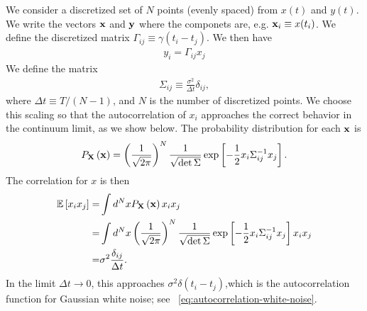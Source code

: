 We consider a discretized set of $N$ points (evenly spaced) from
$x(t)$ and $y(t)$. We write the vectors 
${\bf x}$ and ${\bf y}$ where the componets are, e.g.
${\bf x}_i \equiv x(t_i)$.
We define the discretized matrix $\Gamma_{ij} \equiv \gamma\left(t_i-t_j\right)$.
We then have
\begin{align}
    y_i = \Gamma_{ij} x_j
\end{align}
We define the matrix
\begin{align}
    \Sigma_{ij}
    \equiv 
    \frac{\sigma^2}{\Delta t} \delta_{ij}
    ,
\end{align}
where $\Delta t \equiv T/\left(N-1\right)$, and $N$ is the number of discretized points. 
We choose this scaling so that the autocorrelation of $x_i$ approaches the
correct behavior in the continuum limit, as we show below.
The probability distribution for each ${\bf x}$ is
\begin{align}
    P_{\bf X}\left({\bf x}\right)
    =
    \left(\frac{1}{\sqrt{2\pi}}\right)^N\frac{1}{\sqrt{\det{\Sigma}}}
    \exp\left[-\frac{1}{2}x_i\Sigma^{-1}_{ij}x_j\right]
    .
\end{align}
The correlation for $x$ is then
\begin{align}
    \mathbb{E}\left[x_ix_j\right]
    =&
    \int d^Nx P_{\bf X}\left({\bf x}\right) x_i x_j
    \nonumber\\
    =&
    \int d^Nx 
        \left(\frac{1}{\sqrt{2\pi}}\right)^N\frac{1}{\sqrt{\det{\Sigma}}}
        \exp\left[-\frac{1}{2}x_i\Sigma^{-1}_{ij}x_j\right]
        x_i x_j
    \nonumber\\
    =&
    \sigma^2\frac{\delta_{ij}}{\Delta t}
    .
\end{align}
In the limit $\Delta t\to0$, this approaches $\sigma^2\delta\left(t_i-t_j\right)$,which is the autocorrelation function for Gaussian white noise; 
see ~\eqref{eq:autocorrelation-white-noise}.

